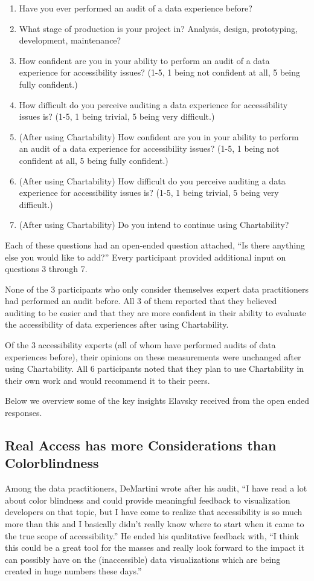 \documentclass[12pt]{cmuthesis}
\begin{document}
\begin{enumerate}
  \item Have you ever performed an audit of a data experience before?
  \item What stage of production is your project in? Analysis, design, prototyping, development, maintenance?
  \item How confident are you in your ability to perform an audit of a data experience for accessibility issues? (1-5, 1 being not confident at all, 5 being fully confident.)
  \item How difficult do you perceive auditing a data experience for accessibility issues is? (1-5, 1 being trivial, 5 being very difficult.)
  \item (After using Chartability) How confident are you in your ability to perform an audit of a data experience for accessibility issues? (1-5, 1 being not confident at all, 5 being fully confident.)
  \item (After using Chartability) How difficult do you perceive auditing a data experience for accessibility issues is? (1-5, 1 being trivial, 5 being very difficult.)
  \item (After using Chartability) Do you intend to continue using Chartability?
\end{enumerate}

Each of these questions had an open-ended question attached, ``Is there anything else you would like to add?'' Every participant provided additional input on questions 3 through 7. 

None of the 3 participants who only consider themselves expert data practitioners had performed an audit before. All 3 of them reported that they believed auditing to be easier and that they are more confident in their ability to evaluate the accessibility of data experiences after using Chartability. 

Of the 3 accessibility experts (all of whom have performed audits of data experiences before), their opinions on these measurements were unchanged after using Chartability. All 6 participants noted that they plan to use Chartability in their own work and would recommend it to their peers. 

Below we overview some of the key insights Elavsky received from the open ended responses.

\subsection{Real Access has more Considerations than Colorblindness}
Among the data practitioners, DeMartini wrote after his audit, ``I have read a lot about color blindness and could provide meaningful feedback to visualization developers on that topic, but I have come to realize that accessibility is so much more than this and I basically didn’t really know where to start when it came to the true scope of accessibility.'' He ended his qualitative feedback with, ``I think this could be a great tool for the masses and really look forward to the impact it can possibly have on the (inaccessible) data visualizations which are being created in huge numbers these days.''
\end{document}
